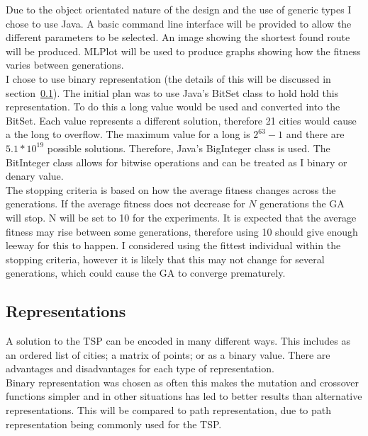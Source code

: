 \documentclass[10pt,a4paper,openbib]{article}
\begin{document}
\begin{multicols}{2}
\noindent Due to the object orientated nature of the design and the use of generic types I chose to use Java. A basic command line interface will be provided to allow the different parameters to be selected. An image showing the shortest found route will be produced. MLPlot \cite{mlPlot} will be used to produce graphs showing how the fitness varies between generations. \\

\noindent I chose to use binary representation (the details of this will be discussed in section~\ref{representation}). The initial plan was to use Java's BitSet class to hold hold this representation. To do this a long value would be used and converted into the BitSet. Each value represents a different solution, therefore 21 cities would cause a the long to overflow. The maximum value for a long is $2^{63}-1$ and there are $5.1*10^{19}$ possible solutions. Therefore, Java's BigInteger class is used. The BitInteger class allows for bitwise operations and can be treated as I binary or denary value. \\

\noindent The stopping criteria is based on how the average fitness changes across the generations. If the average fitness does not decrease for $N$ generations the GA will stop. N will be set to 10 for the experiments. It is expected that the average fitness may rise between some generations, therefore using 10 should give enough leeway for this to happen. I considered using the fittest individual within the stopping criteria, however it is likely that this may not change for several generations, which could cause the GA to converge prematurely.


\subsection{Representations} \label{representation}

A solution to the TSP can be encoded in many different ways. This includes as an ordered list of cities; a matrix of points; or as a binary value. There are advantages and disadvantages for each type of representation. \\

\noindent Binary representation was chosen as often this makes the mutation and crossover functions simpler and in other situations has led to better results than alternative representations. This will be compared to path representation, due to path representation being commonly used for the TSP.\\


\end{multicols}
\end{document}

